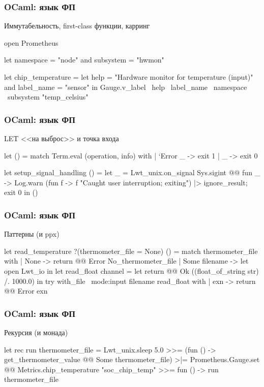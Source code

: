 \begin{frame}[fragile]
  \frametitle{OCaml: язык ФП}

  \large
  Иммутабельность, first-class функции, карринг

  \footnotesize
  \begin{ocamlcode}
open Prometheus

let namespace = "node"
and subsystem = "hwmon"

let chip_temperature =
  let help = "Hardware monitor for temperature (input)"
  and label_name = "sensor" in
  Gauge.v_label ~help ~label_name ~namespace ~subsystem "temp_celsius"
  \end{ocamlcode}
\end{frame}

\begin{frame}[fragile]
  \frametitle{OCaml: язык ФП}

  \large LET <<на выброс>> и точка входа
  \footnotesize
  \begin{ocamlcode}
let () =
  match Term.eval (operation, info) with
  | `Error _ -> exit 1
  | _ -> exit 0

let setup_signal_handling () =
  let _ = Lwt_unix.on_signal Sys.sigint @@
    fun _ ->
      Log.warn (fun f -> f "Caught user interruption; exiting")
      |> ignore_result;
      exit 0
  in ()
  \end{ocamlcode}
\end{frame}

\begin{frame}[fragile]
  \frametitle{OCaml: язык ФП}

  \large Паттерны (и ppx)
  \footnotesize
  \begin{ocamlcode}
let read_temperature ?(thermometer_file = None) () =
  match thermometer_file with
  | None -> return @@ Error No_thermometer_file
  | Some filename ->
     let open Lwt_io in
     let read_float channel =
       let%
       return @@ Ok ((float_of_string str) /. 1000.0)
     in
     try%
           with_file ~mode:input filename read_float
     with
     | exn -> return @@ Error exn
  \end{ocamlcode}
\end{frame}

\begin{frame}[fragile]
  \frametitle{OCaml: язык ФП}

  \large Рекурсия (и монада)
  \footnotesize
  \begin{ocamlcode}
let rec run thermometer_file =
  Lwt_unix.sleep 5.0
  >>= (fun () -> get_thermometer_value @@ Some thermometer_file)
  >|= Prometheus.Gauge.set @@ Metrics.chip_temperature "soc_chip_temp"
  >>= fun () -> run thermometer_file
  \end{ocamlcode}
  \vfill
\end{frame}

